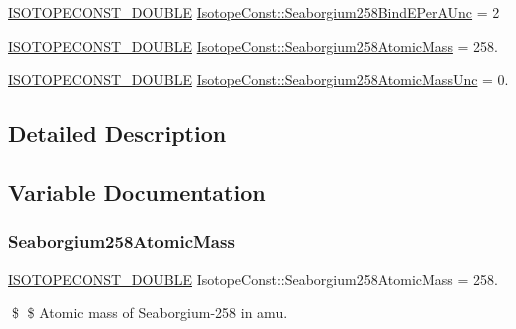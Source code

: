 \begin{DoxyCompactItemize}
\mbox{\hyperlink{group___isotope_const-_macros_ga8f45a7272ce02c0b4c65c44636ed719a}{I\+S\+O\+T\+O\+P\+E\+C\+O\+N\+S\+T\+\_\+\+D\+O\+U\+B\+LE}} \mbox{\hyperlink{group___isotope_const-_seaborgium-_sg258_ga48bccd1ff05ce070159308f41b0cf0a0}{Isotope\+Const\+::\+Seaborgium258\+Bind\+E\+Per\+A\+Unc}} = 2
\item 
\mbox{\hyperlink{group___isotope_const-_macros_ga8f45a7272ce02c0b4c65c44636ed719a}{I\+S\+O\+T\+O\+P\+E\+C\+O\+N\+S\+T\+\_\+\+D\+O\+U\+B\+LE}} \mbox{\hyperlink{group___isotope_const-_seaborgium-_sg258_gab7f79289ec89c0d2d0d0f41ed36a0877}{Isotope\+Const\+::\+Seaborgium258\+Atomic\+Mass}} = 258.
\item 
\mbox{\hyperlink{group___isotope_const-_macros_ga8f45a7272ce02c0b4c65c44636ed719a}{I\+S\+O\+T\+O\+P\+E\+C\+O\+N\+S\+T\+\_\+\+D\+O\+U\+B\+LE}} \mbox{\hyperlink{group___isotope_const-_seaborgium-_sg258_ga47f9be637c50e42a39926dfcc04a60d0}{Isotope\+Const\+::\+Seaborgium258\+Atomic\+Mass\+Unc}} = 0.
\end{DoxyCompactItemize}


\subsection{Detailed Description}


\subsection{Variable Documentation}
\mbox{\label{group___isotope_const-_seaborgium-_sg258_gab7f79289ec89c0d2d0d0f41ed36a0877}} 
\subsubsection{\texorpdfstring{Seaborgium258\+Atomic\+Mass}{Seaborgium258AtomicMass}}
{\footnotesize\ttfamily \mbox{\hyperlink{group___isotope_const-_macros_ga8f45a7272ce02c0b4c65c44636ed719a}{I\+S\+O\+T\+O\+P\+E\+C\+O\+N\+S\+T\+\_\+\+D\+O\+U\+B\+LE}} Isotope\+Const\+::\+Seaborgium258\+Atomic\+Mass = 258.}

\$ \$ Atomic mass of Seaborgium-\/258 in amu. \mbox{\label{group___isotope_const-_seaborgium-_sg258_ga47f9be637c50e42a39926dfcc04a60d0}} 
